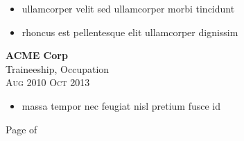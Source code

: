 \documentclass[onside]{article}
\begin{document}
{\begin{minipage}[t][\dimexpr\textheight-2\fboxrule-2\fboxsep\relax][t]{\dimexpr0.6\textwidth-2\fboxrule-2\fboxsep\relax}
\begin{itemize}
            \item ullamcorper velit sed ullamcorper morbi tincidunt
            \item rhoncus est pellentesque elit ullamcorper dignissim
        \end{itemize}
%
        {\large \textbf{ACME Corp}}\\
        {{\selectfont Traineeship, Occupation}}\\
        {\scshape{}\selectfont\footnotesize Aug 2010 \textendash{} Oct 2013}
        \begin{itemize}
            \setlength{\itemsep}{-4pt}
            \item massa tempor nec feugiat nisl pretium fusce id
        \end{itemize}
        \vfill%
        {\hfill\small{}\selectfont Page \thepage of \pageref{LastPage}\hfill}
    \end{minipage}
}%
\end{document}
